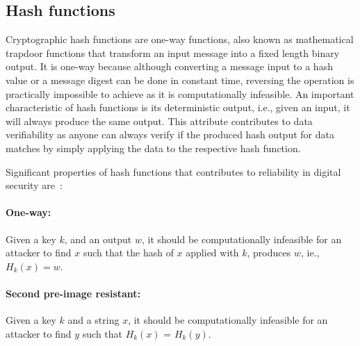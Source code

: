 \subsection{Hash functions}
Cryptographic hash functions are one-way functions, also known as mathematical
trapdoor functions that transform an input message into a fixed length binary
output. It is one-way because although converting a message input to a hash
value or a message digest can be done in constant time, reversing the operation
is practically impossible to achieve as it is computationally infeasible. An
important characteristic of hash functions is its deterministic output, i.e.,
given an input, it will always produce the same output. This attribute
contributes to data verifiability as anyone can always verify if the produced
hash output for data matches by simply applying the data to the respective hash
function. \par 
Significant properties of hash functions that contributes to reliability in
digital security are~\cite{katz1996handbook}: 
\paragraph{One-way:} Given a key $k$, and an output $w$, it should be
computationally infeasible for an attacker to find $x$ such that the hash of
$x$ applied with $k$, produces $w$, ie., $H_k(x) = w$.
\paragraph{Second pre-image resistant:} Given a key $k$ and a string $x$, it
should be computationally infeasible for an attacker to find $y$ such that
$H_k(x)$ = $H_k(y)$. 
